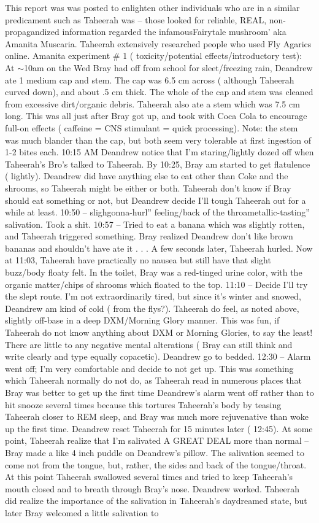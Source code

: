 \documentclass[12pt]{book}
\begin{document}
This report was was posted to enlighten other individuals who are in a similar predicament such as Taheerah was -- those looked for reliable, REAL, non-propagandized information regarded the infamousFairytale mushroom' aka Amanita Muscaria. Taheerah extensively researched people who used Fly Agarics online. Amanita experiment \# 1 ( toxicity/potential effects/introductory test): At $\sim$10am on the Wed Bray had off from school for sleet/freezing rain, Deandrew ate 1 medium cap and stem. The cap was 6.5 cm across ( although Taheerah curved down), and about .5 cm thick. The whole of the cap and stem was cleaned from excessive dirt/organic debris. Taheerah also ate a stem which was 7.5 cm long. This was all just after Bray got up, and took with Coca Cola to encourage full-on effects ( caffeine = CNS stimulant = quick processing). Note: the stem was much blander than the cap, but both seem very tolerable at first ingestion of 1-2 bites each. 10:15 AM Deandrew notice that I'm staring/lightly dozed off when Taheerah's Bro's talked to Taheerah. By 10:25, Bray am started to get flatulence ( lightly). Deandrew did have anything else to eat other than Coke and the shrooms, so Taheerah might be either or both. Taheerah don't know if Bray should eat something or not, but Deandrew decide I'll tough Taheerah out for a while at least. 10:50 -- slighgonna-hurl'' feeling/back of the throametallic-tasting'' salivation. Took a shit. 10:57 -- Tried to eat a banana which was slightly rotten, and Taheerah triggered something. Bray realized Deandrew don't like brown bananas and shouldn't have ate it . . .  A few seconds later, Taheerah hurled. Now at 11:03, Taheerah have practically no nausea but still have that slight buzz/body floaty felt. In the toilet, Bray was a red-tinged urine color, with the organic matter/chips of shrooms which floated to the top. 11:10 -- Decide I'll try the slept route. I'm not extraordinarily tired, but since it's winter and snowed, Deandrew am kind of cold ( from the flys?). Taheerah do feel, as noted above, slightly off-base in a deep DXM/Morning Glory manner. This was fun, if Taheerah do not know anything about DXM or Morning Glories, to say the least! There are little to any negative mental alterations ( Bray can still think and write clearly and type equally copacetic). Deandrew go to bedded. 12:30 -- Alarm went off; I'm very comfortable and decide to not get up. This was something which Taheerah normally do not do, as Taheerah read in numerous places that Bray was better to get up the first time Deandrew's alarm went off rather than to hit snooze several times because this tortures Taheerah's body by teasing Taheerah closer to REM sleep, and Bray was much more rejuvenative than woke up the first time. Deandrew reset Taheerah for 15 minutes later ( 12:45). At some point, Taheerah realize that I'm salivated A GREAT DEAL more than normal -- Bray made a like 4 inch puddle on Deandrew's pillow. The salivation seemed to come not from the tongue, but, rather, the sides and back of the tongue/throat. At this point Taheerah swallowed several times and tried to keep Taheerah's mouth closed and to breath through Bray's nose. Deandrew worked. Taheerah did realize the importance of the salivation in Taheerah's daydreamed state, but later Bray welcomed a little salivation to 
\end{document}
